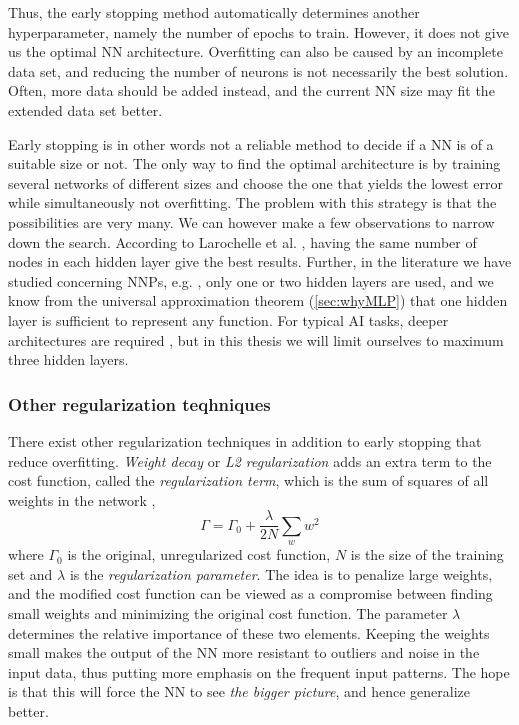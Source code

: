 \documentclass[twoside,english]{uiofysmaster}
\begin{document}
Thus, the early stopping method automatically determines another hyperparameter, namely the number of epochs to train. 
However, it does not give us the optimal NN architecture. Overfitting can also be caused by an incomplete data set, 
and reducing the number of neurons is not necessarily the best solution. Often, more data should be added instead, 
and the current NN size may fit the extended data set better. 

Early stopping is in other words not a reliable method to decide if a NN is of a suitable size or not. 
The only way to find the optimal architecture is by training several networks of different sizes and choose the one that yields
the lowest error while simultaneously not overfitting. The problem with this strategy is that the possibilities are very many. 
We can however make a few observations to narrow down the search. 
According to Larochelle et al. \cite{Larochelle09}, having the same number of nodes in each hidden layer give the best results. 
Further, in the literature we have studied concerning NNPs, e.g. \cite{Behler07} \cite{Raff05} \cite{Witkoskie05}, 
only one or two hidden layers are used, and we know from the universal approximation theorem (\autoref{sec:whyMLP})
that one hidden layer is sufficient to represent any function. For typical AI tasks, deeper architectures are required 
\cite{Bengio07}, but in this thesis we will limit ourselves to maximum three hidden layers. 

\subsubsection{Other regularization teqhniques}
There exist other regularization techniques in addition to early stopping that reduce overfitting. 
\textit{Weight decay} or \textit{L2 regularization} adds an extra term to the cost function, called 
the \textit{regularization term}, which is the sum of squares of all weights in the network \cite{Krogh1992},
\begin{equation}
 \Gamma = \Gamma_0 + \frac{\lambda}{2N}\sum_w w^2
\end{equation}
where $\Gamma_0$ is the original, unregularized cost function, $N$ is the size of the training set and 
$\lambda$ is the \textit{regularization parameter}. The idea is to penalize large weights, and the modified 
cost function can be viewed as a compromise between finding small weights and minimizing the original cost function.
The parameter $\lambda$ determines the relative importance of these two elements. 
Keeping the weights small makes the output of the NN more resistant to outliers and noise in the input data, thus
putting more emphasis on the frequent input patterns. 
The hope is that this will force the NN to see \textit{the bigger picture}, 
and hence generalize better. 
\end{document}
